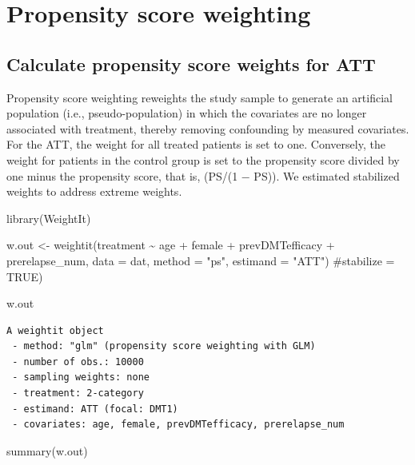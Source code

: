 \documentclass[
  letterpaper,
  DIV=11,
  numbers=noendperiod]{scrreprt}
\newenvironment{Shaded}{\begin{snugshade}}{\end{snugshade}}
\newcommand{\AttributeTok}[1]{\textcolor[rgb]{0.40,0.45,0.13}{#1}}
\newcommand{\CommentTok}[1]{\textcolor[rgb]{0.37,0.37,0.37}{#1}}
\newcommand{\FunctionTok}[1]{\textcolor[rgb]{0.28,0.35,0.67}{#1}}
\newcommand{\NormalTok}[1]{\textcolor[rgb]{0.00,0.23,0.31}{#1}}
\newcommand{\OtherTok}[1]{\textcolor[rgb]{0.00,0.23,0.31}{#1}}
\newcommand{\SpecialCharTok}[1]{\textcolor[rgb]{0.37,0.37,0.37}{#1}}
\newcommand{\StringTok}[1]{\textcolor[rgb]{0.13,0.47,0.30}{#1}}
\begin{document}
\hypertarget{propensity-score-weighting}{%
\section{Propensity score weighting}\label{propensity-score-weighting}}

\hypertarget{calculate-propensity-score-weights-for-att}{%
\subsection{Calculate propensity score weights for
ATT}\label{calculate-propensity-score-weights-for-att}}

Propensity score weighting reweights the study sample to generate an
artificial population (i.e., pseudo-population) in which the covariates
are no longer associated with treatment, thereby removing confounding by
measured covariates. For the ATT, the weight for all treated patients is
set to one. Conversely, the weight for patients in the control group is
set to the propensity score divided by one minus the propensity score,
that is, (PS/(1 − PS)). We estimated stabilized weights to address
extreme weights.

\begin{Shaded}
\begin{Highlighting}[]
\FunctionTok{library}\NormalTok{(WeightIt)}

\NormalTok{w.out }\OtherTok{\textless{}{-}} \FunctionTok{weightit}\NormalTok{(treatment }\SpecialCharTok{\textasciitilde{}}\NormalTok{ age }\SpecialCharTok{+}\NormalTok{ female }\SpecialCharTok{+}\NormalTok{ prevDMTefficacy }\SpecialCharTok{+}\NormalTok{ prerelapse\_num,}
                  \AttributeTok{data =}\NormalTok{ dat,}
                  \AttributeTok{method =} \StringTok{"ps"}\NormalTok{,}
                  \AttributeTok{estimand =} \StringTok{"ATT"}\NormalTok{)}
                  \CommentTok{\#stabilize = TRUE)}

\NormalTok{w.out}
\end{Highlighting}
\end{Shaded}

\begin{verbatim}
A weightit object
 - method: "glm" (propensity score weighting with GLM)
 - number of obs.: 10000
 - sampling weights: none
 - treatment: 2-category
 - estimand: ATT (focal: DMT1)
 - covariates: age, female, prevDMTefficacy, prerelapse_num
\end{verbatim}

\begin{Shaded}
\begin{Highlighting}[]
\FunctionTok{summary}\NormalTok{(w.out)}
\end{Highlighting}
\end{Shaded}
\end{document}
